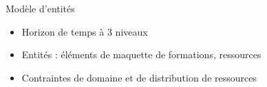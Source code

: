 \documentclass{beamer}
\begin{document}
\begin{frame}{Modèle d'entités}
    \begin{itemize}
        \item Horizon de temps à 3 niveaux
        \item Entités : éléments de maquette de formations, ressources
        \item Contraintes de domaine et de distribution de ressources

\end{itemize}
\end{frame}
\end{document}

